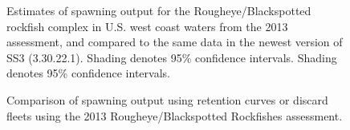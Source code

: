 \documentclass[
]{scrartcl}
\begin{document}
\begin{figure}[H]


\caption{\label{fig-SO_2013}Estimates of spawning output for the
Rougheye/Blackspotted rockfish complex in U.S. west coast waters from
the 2013 assessment, and compared to the same data in the newest version
of SS3 (3.30.22.1). Shading denotes 95\% confidence intervals. Shading
denotes 95\% confidence intervals.}

\end{figure}%

\begin{figure}[H]


\caption{\label{fig-Discard_comp_SO}Comparison of spawning output using
retention curves or discard fleets using the 2013 Rougheye/Blackspotted
Rockfishes assessment.}

\end{figure}%
\end{document}
